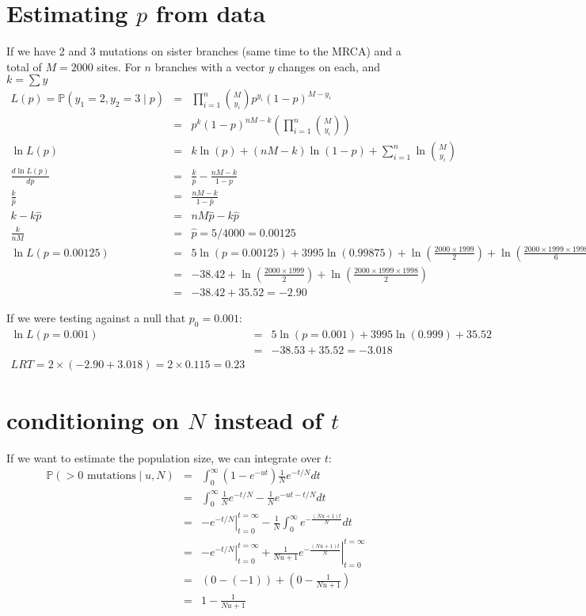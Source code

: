 \documentclass[11pt]{article}
\renewcommand{\Pr}{\mathbb{P}}
\begin{document}
\section*{Estimating $p$ from data}
If we have 2 and 3 mutations on sister branches (same time to the MRCA) and a total of 
$M=2000$ sites.
For $n$ branches with a vector $y$ changes on each, and $k= \sum y$
\begin{eqnarray*}
   L(p) =  \Pr(y_1=2, y_2=3 \mid p)
   & = & \prod_{i=1}^n {M \choose y_i} p^{y_i}(1-p)^{M-y_i} \\ 
   & = & p^{k}(1-p)^{nM-k} \left(\prod_{i=1}^n {M \choose y_i} \right)  \\ 
   \ln L(p) & = & k\ln(p) + (nM - k)\ln(1-p) + \sum_{i=1}^n \ln {M \choose y_i} \\
   \frac{d\ln L(p)}{dp} & = & \frac{k}{p} - \frac{nM - k}{1-p}\\
   \frac{k}{\hat{p}} & = & \frac{nM - k}{1-\hat{p}} \\
   k - k\hat{p} & = & nM\hat{p} - k\hat{p} \\
   \frac{k}{nM} & = & \hat{p} = 5/4000 = 0.00125 \\
   \ln L(p=0.00125) & = & 5\ln(p=0.00125) + 3995\ln(0.99875) + \ln\left({\frac{2000\times 1999}{2}}\right)+ \ln\left({\frac{2000\times 1999\times 1998}{6}}\right) \\
   & = & -38.42 + \ln\left({\frac{2000\times 1999}{2}}\right)+ \ln\left({\frac{2000\times 1999\times 1998}{2}}\right) \\
   & = & -38.42 + 35.52 = -2.90
\end{eqnarray*}

If we were testing against a null that $p_0= 0.001$:
\begin{eqnarray*}
\ln L(p=0.001) & = & 5\ln(p=0.001) + 3995\ln(0.999) + 35.52 \\
& = & -38.53 + 35.52 = - 3.018 \\
LRT = 2\times(-2.90 + 3.018) = 2\times0.115 = 0.23
\end{eqnarray*}
\section*{conditioning on $N$ instead of $t$}
If we want to estimate the population size, we can integrate over $t$:
\begin{eqnarray*}
\Pr(>0 \mbox{ mutations} \mid u, N) & = & \int_0^\infty\left(1 - e^{- ut}\right)\frac{1}{N}e^{-t/N} dt\\
& = & \int_0^\infty\frac{1}{N}e^{-t/N} - \frac{1}{N}e^{- ut-t/N} dt \\
& = & \left.-e^{-t/N}\right|_{t=0}^{t=\infty} - \frac{1}{N}\int_0^\infty e^{-\frac{(Nu + 1)t}{N}} dt \\
& = & \left.-e^{-t/N}\right|_{t=0}^{t=\infty} + \left.\frac{1}{Nu + 1} e^{-\frac{(Nu + 1)t}{N}}\right|_{t=0}^{t=\infty} \\
& = & \left(0 - (-1)\right) + \left(0 - \frac{1}{Nu + 1}\right) \\
& = & 1 - \frac{1}{Nu + 1}
\end{eqnarray*}
\end{document}
